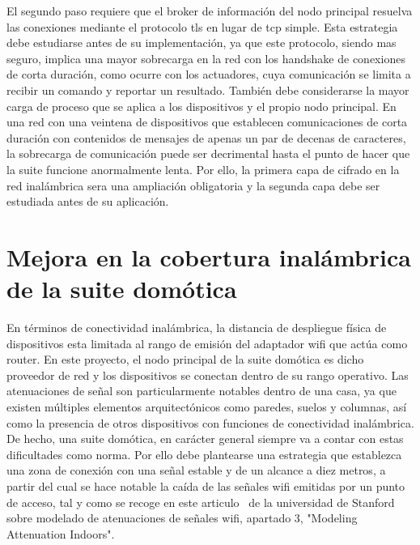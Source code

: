 \vspace{1cm}

El segundo paso requiere que el \gls{broker} de información del nodo principal resuelva las conexiones mediante el protocolo \gls{tls} en lugar de \gls{tcp} simple. Esta estrategia debe estudiarse antes de su implementación, ya que este protocolo, siendo mas seguro, implica una mayor sobrecarga en la red con los \gls{handshake} de conexiones de corta duración, como ocurre con los actuadores, cuya comunicación se limita a recibir un comando y reportar un resultado. También debe considerarse la mayor carga de proceso que se aplica a los dispositivos y el propio nodo principal. En una red con una veintena de dispositivos que establecen comunicaciones de corta duración con contenidos de mensajes de apenas un par de decenas de caracteres, la sobrecarga de comunicación puede ser decrimental hasta el punto de hacer que la suite funcione anormalmente lenta. Por ello, la primera capa de cifrado en la red inalámbrica sera una ampliación obligatoria y la segunda capa debe ser estudiada antes de su aplicación.

\section{Mejora en la cobertura inalámbrica de la suite domótica}
\label{ch:Capitulo6.2}

En términos de conectividad inalámbrica, la distancia de despliegue física de dispositivos esta limitada al rango de emisión del adaptador \gls{wifi} que actúa como router. En este proyecto, el nodo principal de la suite domótica es dicho proveedor de red y los dispositivos se conectan dentro de su rango operativo. Las atenuaciones de señal son particularmente notables dentro de una casa, ya que existen múltiples elementos arquitectónicos como paredes, suelos y columnas, así como la presencia de otros dispositivos con funciones de conectividad inalámbrica. De hecho, una suite domótica, en carácter general siempre va a contar con estas dificultades como norma. Por ello debe plantearse una estrategia que establezca una zona de conexión con una señal estable y de un alcance a diez metros, a partir del cual se hace notable la caída de las señales \gls{wifi} emitidas por un punto de acceso, tal y como se recoge en este articulo~\cite{wifiatenuation} de la universidad de Stanford sobre modelado de atenuaciones de señales \gls{wifi}, apartado 3, "Modeling Attenuation Indoors".

\vspace{1cm}

